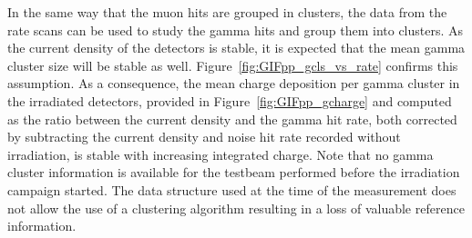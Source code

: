 	In the same way that the muon hits are grouped in clusters, the data from the rate scans can be used to study the gamma hits and group them into clusters. As the current density of the detectors is stable, it is expected that the mean gamma cluster size will be stable as well. Figure~\ref{fig:GIFpp_gcls_vs_rate} confirms this assumption. As a consequence, the mean charge deposition per gamma cluster in the irradiated detectors, provided in Figure~\ref{fig:GIFpp_gcharge} and computed as the ratio between the current density and the gamma hit rate, both corrected by subtracting the current density and noise hit rate recorded without irradiation, is stable with increasing integrated charge. Note that no gamma cluster information is available for the testbeam performed before the irradiation campaign started. The data structure used at the time of the measurement does not allow the use of a clustering algorithm resulting in a loss of valuable reference information.
	
